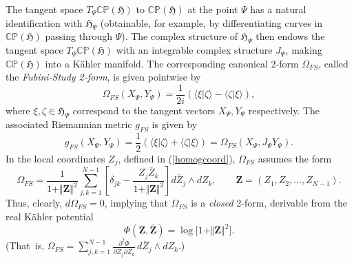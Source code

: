 \documentclass[11pt]{amsart}
\numberwithin{equation}{section}
\theoremstyle{remark}
\newcommand\HH{\mathfrak H}
\newcommand{\prhs}{{\mathbb C\mathbb P}( \HH)}
\begin{document}
The tangent space $T_\Psi\prhs $ to $\prhs$ at the point $\Psi$ has a natural
identification  with $\HH_\Psi$ (obtainable, for example,  by differentiating
curves in $\prhs$ passing  through $\Psi$).
The complex structure of $\HH_\Psi$ then endows the tangent space $T_\Psi\prhs$
with an  integrable complex  structure $J_{\Psi}$, making $\prhs$ into a
K\"ahler manifold. The corresponding  canonical 2-form $\Omega_{FS}$, called
the {\em Fubini-Study 2-form}, is given pointwise by
\begin{equation}
 \Omega_{FS}(X_\Psi, Y_\Psi) =
 \frac{1}{2i} ( \langle \xi \vert \zeta \rangle - \langle
 \zeta\vert \xi \rangle),
\end{equation}
where $  \xi , \zeta  \in \HH_\Psi$  correspond to the tangent vectors $X_\Psi,
Y_\Psi$ respectively. The associated Riemannian metric $g_{FS}$ is given by
\begin{equation}
g_{FS}(X_\Psi, Y_\Psi) = \frac{1}{2} ( \langle \xi \vert \zeta \rangle +
\langle \zeta \vert \xi \rangle) =  \Omega_{FS}(X_\Psi, J_{\Psi}Y_\Psi) .
\end{equation}
In the local coordinates $Z_{j}$, defined in (\ref{homogcoord}), $\Omega_{FS}$
assumes the form
\begin{equation}
\Omega_{FS} = \frac{1}{1+ \Vert{\mathbf Z}\Vert^{2}}\sum_{j,k = 1}^{N-1}
\left[ \delta_{jk} - \frac{Z_{j}\overline{Z}_{k}}
                 {1+ \Vert{\mathbf Z}\Vert^{2}}\right]
d\overline{Z}_{j}\wedge dZ_{k}, \qquad {\mathbf Z}
                  = (Z_{1}, Z_{2}, \ldots , Z_{N-1}).
\end{equation}
Thus, clearly, $d\Omega_{FS} = 0$, implying that $\Omega_{FS}$ is a {\it
closed} 2-form, derivable from the  real K\"ahler potential
\begin{equation}
   \Phi({\mathbf Z}, \overline{\mathbf Z})
   = \log{\lbrack 1+ \Vert{\mathbf Z}\Vert^{2}\rbrack}.
\end{equation}
(That~is, $\Omega_{FS}=\displaystyle\sum_{j,k=1}^{N-1} \frac{\partial^2\Phi}
{\partial \overline Z_j \partial Z_k} \, d\overline Z_j \wedge d Z_k.$)
\end{document}
